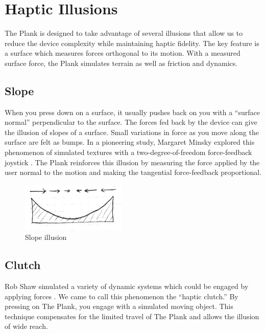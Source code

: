 \section{Haptic Illusions}

The Plank is designed to take advantage of several illusions that allow us to reduce the device complexity while maintaining haptic fidelity. The key feature is a surface which measures forces orthogonal to its motion. With a measured surface force, the Plank simulates terrain as well as friction and dynamics.

\subsection{Slope}
\label{Verplank:sub:2_1}
When you press down on a surface, it usually pushes back on you with a ``surface normal'' perpendicular to the surface. The forces fed back by the device can give the illusion of slopes of a surface. Small variations in force as you move along the surface are felt as bumps. In a pioneering study, Margaret Minsky explored this phenomenon of simulated textures with a two-degree-of-freedom force-feedback joystick \cite{Minsky:1995}. The Plank reinforces this illusion by measuring the force applied by the user normal to the motion and making the tangential force-feedback proportional.

\begin{figure}[ht]
\includegraphics[width=5cm]{Plank2}
\centering

%
\caption{Slope illusion}
\label{Verplank:fig:2}       %
\end{figure}

\subsection{Clutch}
\label{Verplank:sub:2_2}
Rob Shaw simulated a variety of dynamic systems which could be engaged by applying forces \cite{Snibbe:2001}. We came to call this phenomenon the ``haptic clutch.'' By pressing on The Plank, you engage with a simulated moving object. This technique compensates for the limited travel of The Plank and allows the illusion of wide reach.

